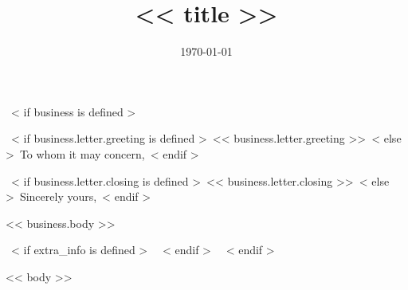\documentclass[<< theme.font_size >>, << theme.font_type >>, << theme.paper_size >>]{moderncv}
\title{<< title >>}
\begin{document}
~< if business is defined >~
\date{\today}
\opening{~< if business.letter.greeting is defined >~<< business.letter.greeting >>~< else >~To whom it may concern,~< endif >~}
\closing{~< if business.letter.closing is defined >~<< business.letter.closing >>~< else >~Sincerely yours,~< endif >~}

\makeatletter
\let\@extrainfo\relax       %
\patchcmd{\makeletterhead}  %
  {\raggedright \@opening}  %
  {\@opening}               %
  {}{}                      %
\makeatother
\makelettertitle            %
<< business.body >>

\makeletterclosing          %
\newpage
\setcounter{page}{1}

  ~< if extra_info is defined >~
  ~< endif >~
~< endif >~


\makecvtitle
\vspace{-20pt}

<< body >>
\end{document}
